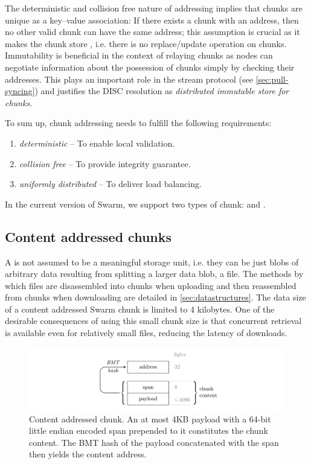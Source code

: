 The deterministic and collision free nature of addressing implies that chunks are unique as a key--value association: If there exists a chunk with an address, then no other valid chunk can have the same address; this assumption is crucial as it makes the chunk store , i.e. there is no replace/update operation on chunks. Immutability is beneficial in the context of relaying chunks as nodes can negotiate information about the possession of chunks simply by checking their addresses. This plays an important role in the stream protocol (see \ref{sec:pull-syncing}) and justifies the DISC resolution as \emph{distributed immutable store for chunks}.

To sum up, chunk addressing needs to fulfill the following requirements:

\begin{enumerate}
    \item \emph{deterministic} -- To enable local validation.
    \item \emph{collision free} -- To provide integrity guarantee.
    \item \emph{uniformly distributed} -- To deliver load balancing.
\end{enumerate}

In the current version of Swarm, we support two types of chunk:  and . 

\subsection{Content addressed  chunks\statusgreen}\label{sec:content-addressed-chunks}

A  is not assumed to be a meaningful storage unit, i.e. they can be just blobs of arbitrary data resulting from splitting a larger data blob, a file. The methods by which files are disassembled into chunks when uploading and then reassembled from chunks when downloading are detailed in \ref{sec:datastructures}. The data size of a content addressed Swarm chunk is limited to 4 kilobytes. One of the desirable consequences of using this small chunk size is that concurrent retrieval is available even for relatively small files, reducing the latency of downloads. 

\begin{figure}[htbp]
   \centering
   \includegraphics[width=\textwidth]{fig/content-addressed-chunk-3.pdf}
   \caption[Content addressed chunk\statusgreen]{Content addressed chunk. An at most 4KB payload with a 64-bit little endian encoded span prepended to it constitutes the chunk content. The BMT hash of the payload concatenated with the span then yields the content address.}
   \label{fig:content-addressed-chunk}
\end{figure}

